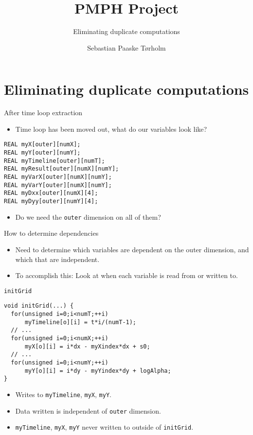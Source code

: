 \documentclass{beamer}
\title{PMPH Project}
\subtitle{Eliminating duplicate computations}
\author{Sebastian Paaske Tørholm}
\institute[Department of Computer Science]{Department of Computer Science}
\begin{document}
\frame[plain]{\titlepage}

\section{Eliminating duplicate computations}
\begin{frame}[fragile]{After time loop extraction}
    \begin{itemize}
        \item<1-> Time loop has been moved out, what do our variables look like? 
    \end{itemize}

    \begin{lstlisting}
REAL myX[outer][numX];
REAL myY[outer][numY];
REAL myTimeline[outer][numT];
REAL myResult[outer][numX][numY];
REAL myVarX[outer][numX][numY];
REAL myVarY[outer][numX][numY];
REAL myDxx[outer][numX][4];
REAL myDyy[outer][numY][4];
    \end{lstlisting}

    \begin{itemize}
        \item<1-> Do we need the \texttt{outer} dimension on all of them? 
    \end{itemize}
\end{frame}

\begin{frame}{How to determine dependencies}
    \begin{itemize}
        \item Need to determine which variables are dependent on the outer dimension,
              and which that are independent.
        \item<2-> To accomplish this: Look at when each variable is read from or written to.
    \end{itemize}
\end{frame}

\begin{frame}[fragile]{\texttt{initGrid}}
\begin{lstlisting}
void initGrid(...) {
  for(unsigned i=0;i<numT;++i)
      myTimeline[o][i] = t*i/(numT-1);
  // ...
  for(unsigned i=0;i<numX;++i)
      myX[o][i] = i*dx - myXindex*dx + s0;
  // ...
  for(unsigned i=0;i<numY;++i)
      myY[o][i] = i*dy - myYindex*dy + logAlpha;
} 
\end{lstlisting}
\begin{itemize}
    \item Writes to \texttt{myTimeline}, \texttt{myX}, \texttt{myY}.
    \item Data written is independent of \texttt{outer} dimension.
    \item \texttt{myTimeline}, \texttt{myX}, \texttt{myY} never written to outside of \texttt{initGrid}.
\end{itemize}
\end{frame}
\end{document}

